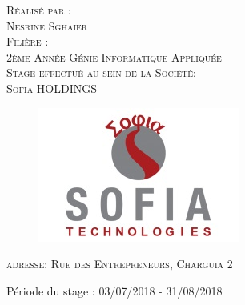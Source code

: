 \begin{titlepage}
{\begin{center}
\textsc{\large Réalisé par :}\\
\vspace{-0.9cm}
\textsc{\LARGE Nesrine Sghaier}\\
\textsc{\large Filière :}\\
\vspace{-0.8cm}
\textsc{\LARGE 2ème  Année  Génie Informatique Appliquée}\\
\textsc{\large Stage effectué au sein de la Société:}\\
\textsc{\Huge Sofia HOLDINGS}\\
\begin{figure} [H]
    \centering
         \begin{center}
           \includegraphics[scale=0.6]{img/sofia-technologies.jpg}
        \end{center}
\end{figure}
\vspace{-1cm}
\textsc{\large adresse: Rue des Entrepreneurs, Charguia 2} 

\end{center}
\bigskip
\noindent             {\hfill 
         \hfill}\hfill Période du stage : 03/07/2018 - 31/08/2018
}
\end{titlepage}

